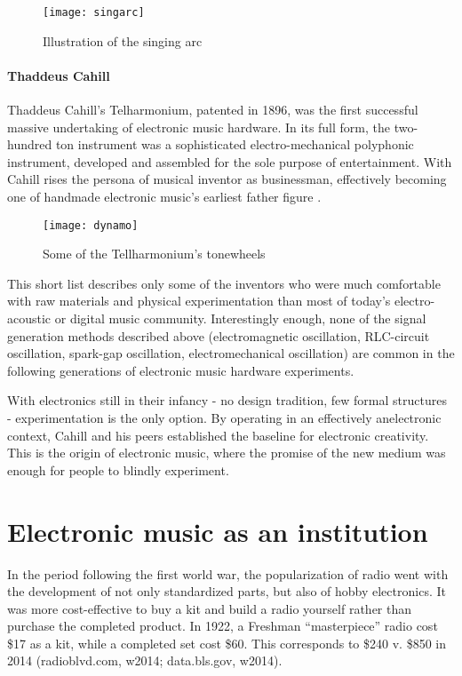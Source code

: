 	\begin{figure}[h!]
	  \caption{Illustration of the singing arc}
	  \centering
	    \texttt{[image: singarc]}
	\end{figure}

\paragraph{Thaddeus Cahill}

	Thaddeus Cahill’s Telharmonium, patented in 1896, was the first successful massive undertaking of electronic music hardware. In its full form, the two-hundred ton instrument was a sophisticated electro-mechanical polyphonic instrument, developed and assembled for the sole purpose of entertainment. With Cahill rises the persona of musical inventor as businessman, effectively becoming one of handmade electronic music’s earliest father figure \cite{holmes2002}. 
	
	\begin{figure}[h!]
	  \caption{Some of the Tellharmonium's tonewheels}
	  \centering
	    \texttt{[image: dynamo]}
	\end{figure}

	This short list describes only some of the inventors who were much comfortable with raw materials and physical experimentation than most of today’s electro-acoustic or digital music community. Interestingly enough, none of the signal generation methods described above (electromagnetic oscillation, RLC-circuit oscillation, spark-gap oscillation, electromechanical oscillation) are common in the following generations of electronic music hardware experiments. 

	With electronics still in their infancy - no design tradition, few formal structures -  experimentation is the only option. By operating in an effectively anelectronic context, Cahill and his peers established the baseline for electronic creativity. This is the origin of electronic music, where the promise of the new medium was enough for people to blindly experiment. 

\section{Electronic music as an institution}

In the period following the first world war, the popularization of radio went with the development of not only standardized parts, but also of hobby electronics. It was more cost-effective to buy a kit and build a radio yourself rather than purchase the completed product. In 1922, a Freshman “masterpiece” radio cost \$17 as a kit, while a completed set cost \$60. This corresponds to \$240 v. \$850 in 2014 (radioblvd.com, w2014; data.bls.gov, w2014). 

